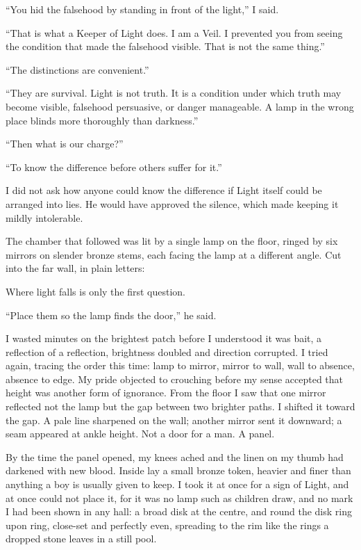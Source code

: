 ``You hid the falsehood by standing in front of the light,'' I said.\par
``That is what a Keeper of Light does. I am a Veil.
I prevented you from seeing the condition that made the falsehood visible. That is not the same thing.''\par
``The distinctions are convenient.''\par
``They are survival. 
Light is not truth. 
It is a condition under which truth may become visible, falsehood persuasive, or danger manageable. 
A lamp in the wrong place blinds more thoroughly than darkness.''\par
``Then what is our charge?''\par
``To know the difference before others suffer for it.''\par

I did not ask how anyone could know the difference if Light itself could be arranged into lies. 
He would have approved the silence, which made keeping it mildly intolerable.\par

\ornament

The chamber that followed was lit by a single lamp on the floor, ringed by six mirrors on slender bronze stems, each facing the lamp at a different angle. 
Cut into the far wall, in plain letters:\par

\begin{scripture}
Where light falls is only the first question.
\end{scripture}

``Place them so the lamp finds the door,'' he said. 

I wasted minutes on the brightest patch before I understood it was bait, a reflection of a reflection, brightness doubled and direction corrupted. 
I tried again, tracing the order this time: lamp to mirror, mirror to wall, wall to absence, absence to edge. 
My pride objected to crouching before my sense accepted that height was another form of ignorance. 
From the floor I saw that one mirror reflected not the lamp but the gap between two brighter paths. 
I shifted it toward the gap. 
A pale line sharpened on the wall; another mirror sent it downward; a seam appeared at ankle height. 
Not a door for a man. A panel.\par

By the time the panel opened, my knees ached and the linen on my thumb had darkened with new blood. 
Inside lay a small bronze token, heavier and finer than anything a boy is usually given to keep. 
I took it at once for a sign of Light, and at once could not place it, for it was no lamp such as children draw, and no mark I had been shown in any hall: 
a broad disk at the centre, and round the disk ring upon ring, close-set and perfectly even, spreading to the rim like the rings a dropped stone leaves in a still pool.\par

